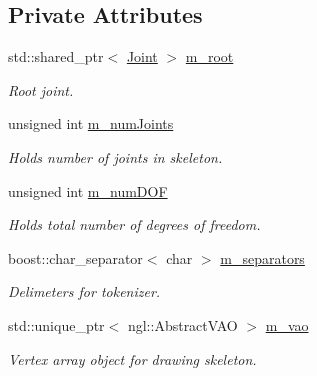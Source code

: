 \subsection*{Private Attributes}
\begin{DoxyCompactItemize}
\item 
std\+::shared\+\_\+ptr$<$ \hyperlink{struct_joint}{Joint} $>$ \hyperlink{class_skeleton_ae4aa6e48bbc4d30abc1d2624f2ebc63c}{m\+\_\+root}\hypertarget{class_skeleton_ae4aa6e48bbc4d30abc1d2624f2ebc63c}{}\label{class_skeleton_ae4aa6e48bbc4d30abc1d2624f2ebc63c}

\begin{DoxyCompactList}\small\item\em Root joint. \end{DoxyCompactList}\item 
unsigned int \hyperlink{class_skeleton_a98a7d74e50ea3212efdb473c7e3ab5a9}{m\+\_\+num\+Joints}\hypertarget{class_skeleton_a98a7d74e50ea3212efdb473c7e3ab5a9}{}\label{class_skeleton_a98a7d74e50ea3212efdb473c7e3ab5a9}

\begin{DoxyCompactList}\small\item\em Holds number of joints in skeleton. \end{DoxyCompactList}\item 
unsigned int \hyperlink{class_skeleton_ab01e07c987685ee694322ddb284aa6fb}{m\+\_\+num\+D\+OF}\hypertarget{class_skeleton_ab01e07c987685ee694322ddb284aa6fb}{}\label{class_skeleton_ab01e07c987685ee694322ddb284aa6fb}

\begin{DoxyCompactList}\small\item\em Holds total number of degrees of freedom. \end{DoxyCompactList}\item 
boost\+::char\+\_\+separator$<$ char $>$ \hyperlink{class_skeleton_aa6c2c251924399763602cd57df4e81f3}{m\+\_\+separators}\hypertarget{class_skeleton_aa6c2c251924399763602cd57df4e81f3}{}\label{class_skeleton_aa6c2c251924399763602cd57df4e81f3}

\begin{DoxyCompactList}\small\item\em Delimeters for tokenizer. \end{DoxyCompactList}\item 
std\+::unique\+\_\+ptr$<$ ngl\+::\+Abstract\+V\+AO $>$ \hyperlink{class_skeleton_ae289df69aaf63b1cc66aac959a72c0df}{m\+\_\+vao}\hypertarget{class_skeleton_ae289df69aaf63b1cc66aac959a72c0df}{}\label{class_skeleton_ae289df69aaf63b1cc66aac959a72c0df}

\begin{DoxyCompactList}\small\item\em Vertex array object for drawing skeleton. \end{DoxyCompactList}\end{DoxyCompactItemize}


